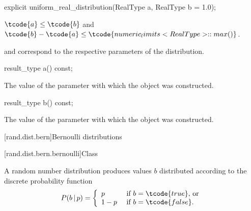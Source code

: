 %
\begin{itemdecl}
explicit uniform_real_distribution(RealType a, RealType b = 1.0);
\end{itemdecl}

\begin{itemdescr}
\pnum
\expects
$\tcode{a} \leq \tcode{b}$
and
$\tcode{b} - \tcode{a} \leq \tcode{numeric_limits<RealType>::max()}$.

\pnum
\remarks
  and 
 correspond to the respective parameters of the distribution.
\end{itemdescr}

%
\begin{itemdecl}
result_type a() const;
\end{itemdecl}

\begin{itemdescr}
\pnum
\returns
The value of the  parameter
 with which the object was constructed.
\end{itemdescr}

%
\begin{itemdecl}
result_type b() const;
\end{itemdecl}

\begin{itemdescr}
\pnum
\returns
The value of the  parameter
 with which the object was constructed.
\end{itemdescr}%
%



[rand.dist.bern]{Bernoulli distributions}%
%
%


[rand.dist.bern.bernoulli]{Class }%
%

\pnum
A  random number distribution
produces  values $b$
distributed according to
the discrete probability function
\[  P(b\,|\,p) = \left\{ \begin{array}{ll}
                          p     & \text{ if $b = \tcode{true}$, or} \\
                          1 - p & \text{ if $b = \tcode{false}$.}
                          \end{array}\right.
\]

